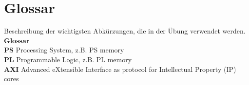 \newpage
\section{Glossar}
Beschreibung der wichtigsten Abkürzungen, die in der Übung verwendet werden.\\

\textbf{Glossar}\\
\textbf{PS}	Processing System, z.B. PS memory \\
\textbf{PL} 	Programmable Logic, z.B. PL memory\\
\textbf{AXI} Advanced eXtensible Interface as protocol for Intellectual Property (IP) cores\\
